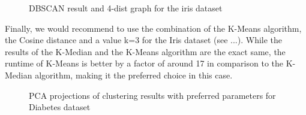 \begin{figure}[H]
	\caption{DBSCAN result and 4-dist graph for the iris dataset} 
	\label{dbscaniris}
\end{figure}

Finally, we would recommend to use the combination of the K-Means algorithm, the Cosine distance and a value k=3 for the Iris dataset (see ...). While the results of the K-Median and the K-Means algorithm are the exact same, the runtime of K-Means is better by a factor of around 17 in comparison to the K-Median algorithm, making it the preferred choice in this case. \\

\begin{figure}[H]
	\caption{PCA projections of clustering results with preferred parameters for Diabetes dataset}
	\label{fig:iris_bestparams}
\end{figure}

